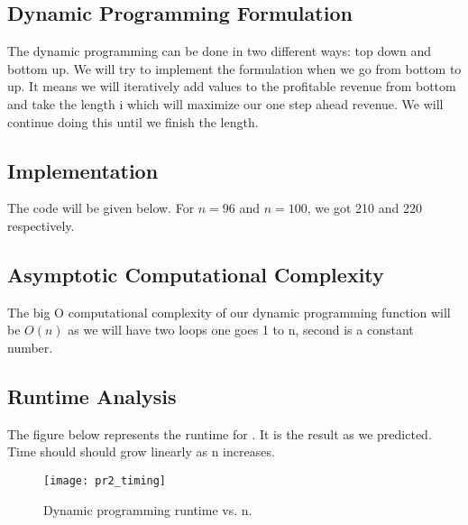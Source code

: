 \subsection{Dynamic Programming Formulation}
The dynamic programming can be done in two different ways: top down and bottom up. We will try to implement the formulation when we go from bottom to up. It means we will iteratively add values to the profitable revenue from bottom and take the length i which will maximize our one step ahead revenue. We will continue doing this until we finish the length.
	

\subsection{Implementation}
	The code will be given below. For $n=96$ and $n=100$, we got 210 and 220 respectively.

\subsection{Asymptotic Computational Complexity}
	The big O computational complexity of our dynamic programming function will be $O(n)$ as we will have two loops one goes 1 to n, second is a constant number. 

\subsection{Runtime Analysis}

	The figure below represents the runtime for . It is the result as we predicted. Time should should grow linearly as n increases. 
	
		\begin{figure}[H]
		\centering\texttt{[image: pr2\_timing]}
		\caption{Dynamic programming runtime vs. n.}
		\end{figure}